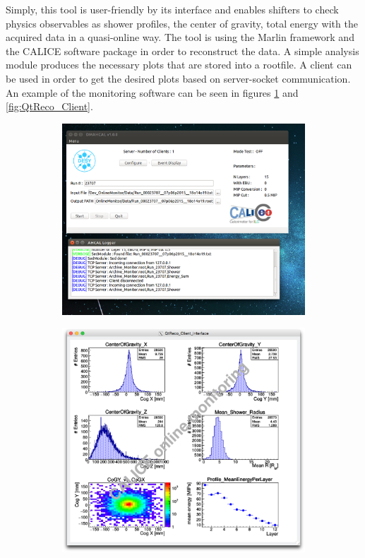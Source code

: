 Simply, this tool is user-friendly by its interface and enables shifters to check physics observables as shower profiles, the center of gravity, total energy with the acquired data in a quasi-online way. The tool is using the Marlin framework and the CALICE software package in order to reconstruct the data. A simple analysis module produces the necessary plots that are stored into a rootfile. A client can be used in order to get the desired plots based on server-socket communication. An example of the monitoring software can be seen in figures \ref{fig:QtReco_Server} and \ref{fig:QtReco_Client}.
\begin{figure}[htbp!]
	\begin{subfigure}[t]{0.5\textwidth}
		\centering
		\includegraphics[width=1\linewidth]{chap5/fig_EnergyCalib/QtReco_Marlin.png}
		\caption{} \label{fig:QtReco_Server}
	\end{subfigure}
	\hfill
	\begin{subfigure}[t]{0.5\textwidth}
		\centering
		\includegraphics[width=1\linewidth]{chap5/fig_EnergyCalib/Shower_pion.png}

\end{subfigure}
\end{figure}
